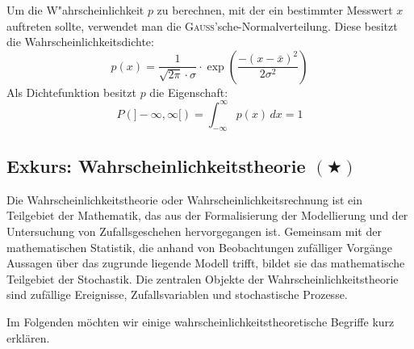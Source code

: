 Um die W"ahrscheinlichkeit $p$ zu berechnen, mit der ein bestimmter
Messwert $x$ auftreten sollte, verwendet man die
\textsc{Gauss}'sche-Normalverteilung. Diese besitzt die Wahrscheinlichkeitsdichte:
\begin{equation}
   p(x) = \frac{1}{\sqrt{2\pi} \cdot \sigma} \cdot 
   \exp\left ( \frac{- (x-\bar x)^2}{2\sigma^2} \right )
\end{equation}
Als Dichtefunktion besitzt $ p $ die Eigenschaft:
\[
P(]-\infty, \infty[)=\int_{-\infty}^{\infty} p(x)\, dx=1
\]

\subsection{Exkurs: Wahrscheinlichkeitstheorie $ (\bigstar) $}
\begin{Def}
Die Wahrscheinlichkeitstheorie oder Wahrscheinlichkeitsrechnung ist ein Teilgebiet der Mathematik, das aus der Formalisierung der Modellierung und der Untersuchung von Zufallsgeschehen hervorgegangen ist. Gemeinsam mit der mathematischen Statistik, die anhand von Beobachtungen zufälliger Vorgänge Aussagen über das zugrunde liegende Modell trifft, bildet sie das mathematische Teilgebiet der Stochastik. Die zentralen Objekte der Wahrscheinlichkeitstheorie sind zufällige Ereignisse, Zufallsvariablen und stochastische Prozesse.
\end{Def}
Im Folgenden möchten wir einige wahrscheinlichkeitstheoretische Begriffe kurz erklären. 
